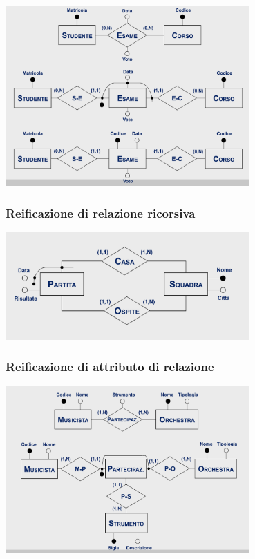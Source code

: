\begin{center}
    \includegraphics[width=0.7\textwidth]{img/reificazioneDiRelazioneBinaria.png}
\end{center}

\subsubsection{Reificazione di relazione ricorsiva}

\begin{center}
    \includegraphics[width=0.7\textwidth]{img/reificazioneDiRelazioneRicorsiva.png}
\end{center}


\subsubsection{Reificazione di attributo di relazione}

\begin{center}
    \includegraphics[width=0.7\textwidth]{img/reificazioneDiAttributoDiRelazione.png}
\end{center}

